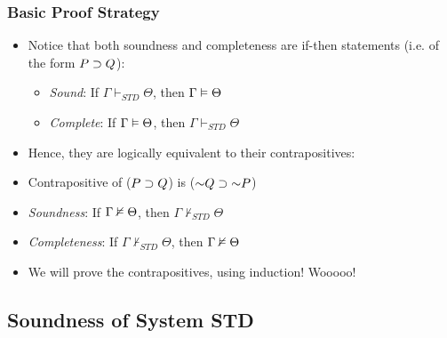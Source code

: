 \begin{frame}
\frametitle{Basic Proof Strategy}

\begin{itemize}[<+->]

\item Notice that both soundness and completeness are if-then statements (i.e. of the form $P \supset Q$):

\begin{itemize}

\item \emph{Sound}: If $\Gamma \vdash_{STD} \Theta$, then $\Gamma \vDash \Theta$

\item \emph{Complete}: If $\Gamma \vDash \Theta$, then $\Gamma \vdash_{STD} \Theta$

\end{itemize}

\bigskip

\item Hence, they are logically equivalent to their contrapositives: 

\bi

\item Contrapositive of ($P \supset Q$) is ($\enot Q \eif \enot P$)

\item \emph{Soundness}: If $\Gamma \nvDash \Theta$, then $\Gamma \nvdash_{STD} \Theta$ 

\item \emph{Completeness}: If $\Gamma \nvdash_{STD} \Theta$, then $\Gamma \nvDash \Theta$

\ei 

\bigskip

\item We will prove the contrapositives, using induction! Wooooo!


\end{itemize}
\end{frame}








\iffalse %

\fi %


\subsection{Soundness of System STD}

